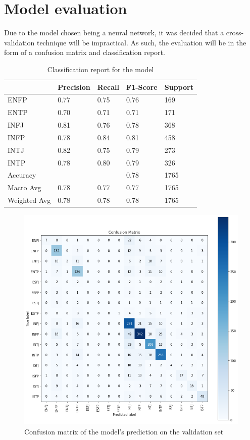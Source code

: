 \documentclass[11pt,a4paper]{article}
\begin{document}
	\newpage
	
	\section{Model evaluation}
	
	Due to the model chosen being a neural network, it was decided that a cross-validation technique will be impractical. As such, the evaluation will be in the form of a confusion matrix and classification report.
	
	\begin{table}[h!]
		\centering
		\begin{tabular}{l|llll}
			& Precision & Recall & F1-Score & Support \\ \hline
			ENFP         & 0.77      & 0.75   & 0.76     & 169     \\
			ENTP         & 0.70      & 0.71   & 0.71     & 171     \\
			INFJ         & 0.81      & 0.76   & 0.78     & 368     \\
			INFP         & 0.78      & 0.84   & 0.81     & 458     \\
			INTJ         & 0.82      & 0.75   & 0.79     & 273     \\
			INTP         & 0.78      & 0.80   & 0.79     & 326     \\
			Accuracy     &           &        & 0.78     & 1765    \\
			Macro Avg    & 0.78      & 0.77   & 0.77     & 1765    \\
			Weighted Avg & 0.78      & 0.78   & 0.78     & 1765   
		\end{tabular}
		\caption{Classification report for the model}
		\label{tab:my-table}
	\end{table}
	
	\begin{figure}[h!]
		\centering
		
		\includegraphics[height=11cm]{../output/visualisations/confusion}
		
		\caption{Confusion matrix of the model's prediction on the validation set}
		
	\end{figure}
	
\end{document}
